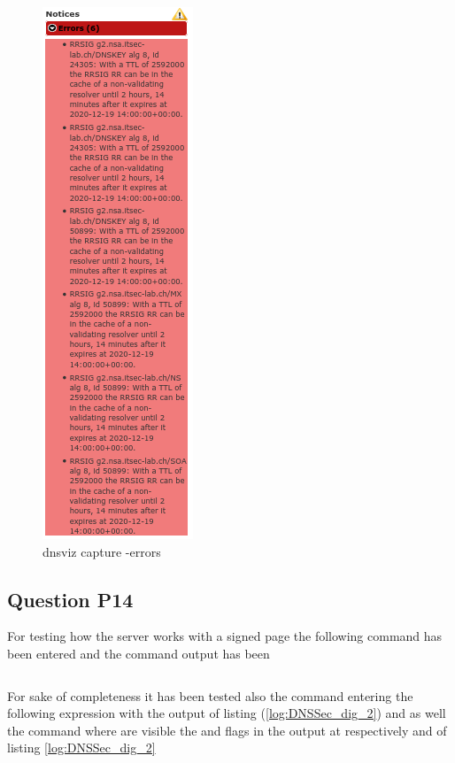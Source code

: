 \begin{figure}[H]
	\centering
	\includegraphics[height=0.5\textheight]{images/errors_dnsviz.png}
	\caption{dnsviz capture -errors}
	\label{fig:dnsviz capture_errors}
\end{figure}


\subsection{Question P14}

For testing how the server works with a signed page the following command has been entered  and the command output has been 

\inputminted{text}{DNSSec_switch_test.txt}
\label{log:DNSSec_switch}

For sake of completeness it has been tested also the  command entering the following expression  with the output of listing (\ref{log:DNSSec_dig_2}) and as well the command  where are visible the  and  flags in the output at respectively  and  of listing \ref{log:DNSSec_dig_2}

